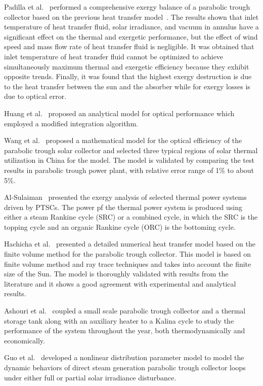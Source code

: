Padilla et al.~\cite{Padilla2014} performed a comprehensive exergy balance of a parabolic trough collector based on the previous heat transfer model~\cite{Padilla2011}. The results shown that inlet temperature of heat transfer fluid, solar irradiance, and vacuum in annulus have a significant effect on the thermal and exergetic performance, but the effect of wind speed and mass flow rate of heat transfer fluid is negligible. It was obtained that inlet temperature of heat transfer fluid cannot be optimized to achieve simultaneously maximum thermal and exergetic efficiency because they exhibit opposite trends. Finally, it was found that the highest exergy destruction is due to the heat transfer between the sun and the absorber while for exergy losses is due to optical error.

Huang et al.~\cite{Huang2012} proposed an analytical model for optical performance which employed a modified integration algorithm.

Wang et al.~\cite{Wang2016} proposed a mathematical model for the optical efficiency of the parabolic trough solar collector and selected three typical regions of solar thermal utilization in China for the model. The model is validated by comparing the test results in parabolic trough power plant, with relative error range of 1\% to about 5\%.

Al-Sulaiman~\cite{AlSulaiman2014} presented the exergy analysis of selected thermal power systems driven by PTSCs. The power pf the thermal power system is produced using either a steam Rankine cycle (SRC) or a combined cycle, in which the SRC is the topping cycle and an organic Rankine cycle (ORC) is the bottoming cycle.

Hachicha et al.~\cite{Hachicha2013} presented a detailed numerical heat transfer model based on the finite volume method for the parabolic trough collector.  This model is based on finite volume method and ray trace techniques and takes into account the finite size of the Sun.  The model is thoroughly validated with results from the literature and it shows a good agreement with experimental and analytical results.

Ashouri et al.~\cite{Ashouri2015} coupled a small scale parabolic trough collector and a thermal storage tank along with an auxiliary heater to a Kalina cycle to study the performance of the system throughout the year, both thermodynamically and economically.

Guo et al.~\cite{SuGuo2016} developed a nonlinear distribution parameter model to model the dynamic behaviors of direct steam generation parabolic trough collector loops under either full or partial solar irradiance disturbance.

